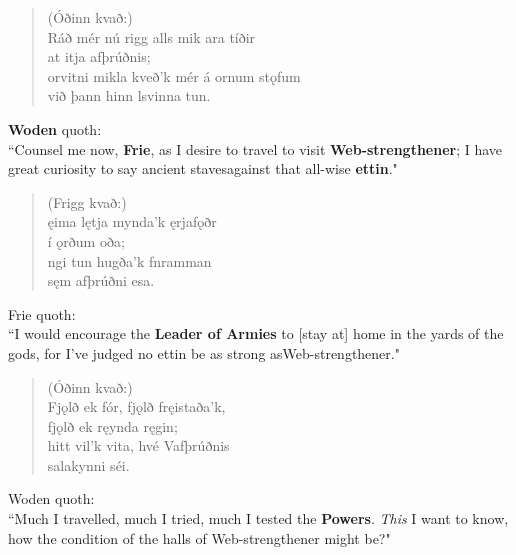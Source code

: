 \bookStart

\begin{verse}
(Óðinn kvað:) \\%
\bva Ráð mér nú rigg \hld alls mik ara tíðir \\%
\ind at itja afþrúðnis; \\%
orvitni mikla \hld kveð'k mér á ornum stǫfum \\%
\ind við þann hinn lsvinna tun.\\%
\end{verse}

\bvb \textbf{Woden} quoth: \\ “Counsel me now, \textbf{Frie}, as I desire to travel to visit \textbf{Web-strengthener}; I have great curiosity to say ancient staves\footnotemark[1] against that all-wise \textbf{ettin}." \\

\begin{verse}
(Frigg kvað:) \\%
\bva {}ęima lętja \hld mynda'k ęrjafǫðr \\%
\ind í ǫrðum oða; \\%
ngi tun \hld hugða'k fnramman \\%
\ind sęm afþrúðni esa.\\%
\end{verse}

\bvb Frie quoth: \\ “I would encourage the \textbf{Leader of Armies} to [stay at] home in the yards of the gods, for I've judged no ettin be as strong as\footnotemark[3] Web-strengthener." \\

\begin{verse}
(Óðinn kvað:) \\%
\bva Fjǫlð ek fór, \hld fjǫlð fręistaða'k, \\%
\ind fjǫlð ek ręynda ręgin; \\%
hitt vil'k vita, \hld hvé Vafþrúðnis \\%
\ind salakynni séi.\\%
\end{verse}

\bvb Woden quoth: \\ “Much I travelled, much I tried, much I tested the \textbf{Powers}\footnotemark[4]. \emph{This} I want to know, how the condition of the halls of Web-strengthener might be?" \\

